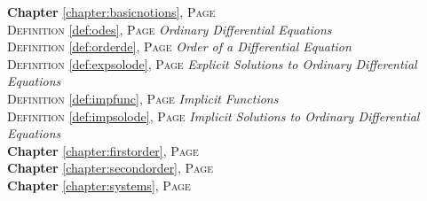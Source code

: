 
\begin{multicols}{2}
      \setlength{\parindent}{0pt}
      \footnotesize{

\textbf{Chapter} \ref{chapter:basicnotions}, \textsc{Page} \pageref{chapter:basicnotions} \\
\textsc{Definition} \ref{def:odes}, \textsc{Page} \pageref{def:odes} \textit{Ordinary Differential Equations} \\
\textsc{Definition} \ref{def:orderde}, \textsc{Page} \pageref{def:orderde} \textit{Order of a Differential Equation} \\
\textsc{Definition} \ref{def:expsolode}, \textsc{Page} \pageref{def:expsolode} \textit{Explicit Solutions to Ordinary Differential Equations} \\
\textsc{Definition} \ref{def:impfunc}, \textsc{Page} \pageref{def:impfunc} \textit{Implicit Functions} \\
\textsc{Definition} \ref{def:impsolode}, \textsc{Page} \pageref{def:impsolode} \textit{Implicit Solutions to Ordinary Differential Equations} \\
\textbf{Chapter} \ref{chapter:firstorder}, \textsc{Page} \pageref{chapter:firstorder} \\
\textbf{Chapter} \ref{chapter:secondorder}, \textsc{Page} \pageref{chapter:secondorder} \\
\textbf{Chapter} \ref{chapter:systems}, \textsc{Page} \pageref{chapter:systems} \\

      }
\end{multicols}

